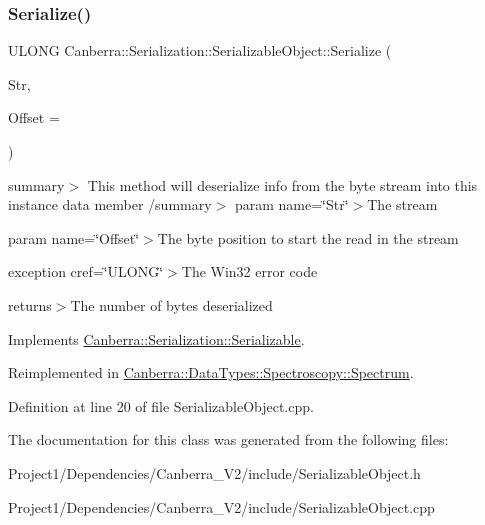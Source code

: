 \mbox{\label{class_canberra_1_1_serialization_1_1_serializable_object_a33e593c04b50f36e8dad06b3b7471a9c_a33e593c04b50f36e8dad06b3b7471a9c}} 
\subsubsection{\texorpdfstring{Serialize()}{Serialize()}}
{\footnotesize\ttfamily U\+L\+O\+NG Canberra\+::\+Serialization\+::\+Serializable\+Object\+::\+Serialize (\begin{DoxyParamCaption}\item[{\hyperlink{class_canberra_1_1_utility_1_1_core_1_1_byte_stream}{Canberra\+::\+Utility\+::\+Core\+::\+Byte\+Stream} \&}]{Str,  }\item[{const L\+O\+NG}]{Offset = {} }\end{DoxyParamCaption})\hspace{0.3cm}{\ttfamily [virtual]}}

summary$>$ This method will deserialize info from the byte stream into this instance data member /summary$>$ param name=\char`\"{}\+Str\char`\"{}$>$The stream

param name=\char`\"{}\+Offset\char`\"{}$>$The byte position to start the read in the stream

exception cref=\char`\"{}\+U\+L\+O\+N\+G\char`\"{}$>$The Win32 error code

returns$>$The number of bytes deserialized

Implements \hyperlink{class_canberra_1_1_serialization_1_1_serializable}{Canberra\+::\+Serialization\+::\+Serializable}.



Reimplemented in \hyperlink{class_canberra_1_1_data_types_1_1_spectroscopy_1_1_spectrum_ac5f0fa880e88960afa1547a60ed8c8f4_ac5f0fa880e88960afa1547a60ed8c8f4}{Canberra\+::\+Data\+Types\+::\+Spectroscopy\+::\+Spectrum}.



Definition at line 20 of file Serializable\+Object.\+cpp.



The documentation for this class was generated from the following files\+:\begin{DoxyCompactItemize}
\item 
Project1/\+Dependencies/\+Canberra\+\_\+\+V2/include/Serializable\+Object.\+h\item 
Project1/\+Dependencies/\+Canberra\+\_\+\+V2/include/Serializable\+Object.\+cpp\end{DoxyCompactItemize}
